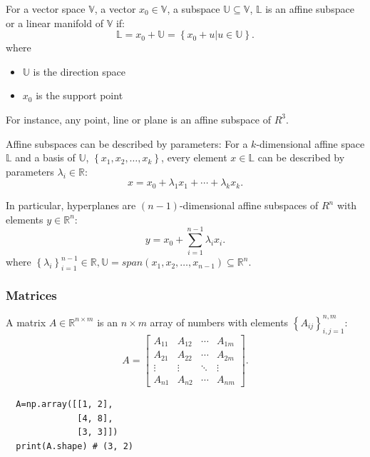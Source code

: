 \begin{definition}
  For a vector space $\mathbb{V}$, a vector $x_0\in \mathbb{V}$, a subspace
  $\mathbb{U}\subseteq \mathbb{V}$, $\mathbb{L}$ is an affine subspace or a
  linear manifold of $\mathbb{V}$ if:
  \[\mathbb{L}=x_0+\mathbb{U}=\left\{ x_0+u | u\in \mathbb{U} \right\}.\]
where
\begin{itemize}
  \item $\mathbb{U}$ is the direction space
  \item $x_0$ is the support point
\end{itemize}
\end{definition}
\begin{example}
  For instance, any point, line or plane is an affine subspace of $R^{3}$.
\end{example}
Affine subspaces can be described by parameters: For a $k$-dimensional affine
space $\mathbb{L}$ and a basis of $\mathbb{U}$, $\left\{ x_1,x_2,\ldots,x_k
\right\}$, every element $x\in \mathbb{L}$ can be described by parameters
$\lambda_i\in \mathbb{R}$:
\[x=x_0+\lambda_1x_1+\cdots+\lambda_k x_k.\]
\begin{example}[Hyperplanes]
  In particular, hyperplanes are $(n-1)$-dimensional affine subspaces of $R^{n}$ with elements
  $y\in \mathbb{R}^{n}$:
  \[y=x_0+\sum_{i=1}^{n-1} \lambda_{i}x_i.\]
  where $\left\{ \lambda_i \right\} _{i=1}^{n-1}\in \mathbb{R},
  \mathbb{U}=span(x_1,x_2,\ldots,x_{n-1})\subseteq \mathbb{R}^{n}$.
\end{example}

\subsubsection{Matrices}
\begin{definition}[Matrices]
  A matrix $A\in \mathbb{R}^{n\times m}$ is an $n\times m$ array of numbers with elements
  $\left\{ A_{ij} \right\} _{i,j=1}^{n,m}$:
  \[A=
    \begin{bmatrix} A_{11}&A_{12}&\cdots&A_{1m} \\
      A_{21}&A_{22}&\cdots&A_{2m}\\
      \vdots&\vdots&\ddots&\vdots\\
    A_{n1}&A_{n2}&\cdots&A_{nm}\end{bmatrix}.\] 
\end{definition}
\begin{lstlisting}
  A=np.array([[1, 2],
              [4, 8],
              [3, 3]])
  print(A.shape) # (3, 2)
\end{lstlisting}

